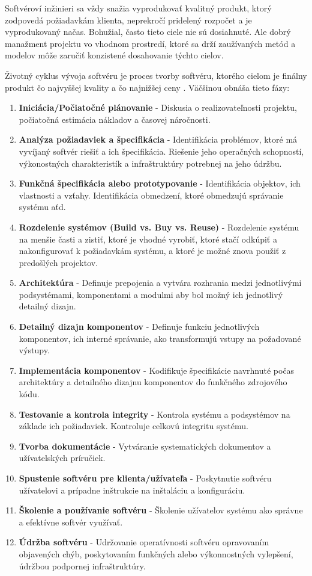 \documentclass[10pt,twoside,slovak,a4paper]{article}
\begin{document}
Softvéroví inžinieri sa vždy snažia vyprodukovať kvalitný produkt, ktorý zodpovedá požiadavkám klienta, neprekročí pridelený rozpočet a je vyprodukovaný načas. Bohužial, často tieto ciele nie sú dosiahnuté. Ale dobrý manažment projektu vo vhodnom prostredí, ktoré sa drží zaužívaných metód a modelov môže zaručiť konzistené dosahovanie týchto cielov. \cite{Methodologies}

Životný cyklus vývoja softvéru je proces tvorby softvéru, ktorého cielom je finálny produkt čo najvyššej kvality a čo najnižšej ceny \cite{SDLCdef}. Väčšinou obnáša tieto fázy:\cite{SDCLphases}
\begin{enumerate}
\item \textbf{Iniciácia/Počiatočné plánovanie} - Diskusia o realizovateľnosti projektu, počiatočná estimácia nákladov a časovej náročnosti.
\item \textbf{Analýza požiadaviek a špecifikácia} - Identifikácia problémov, ktoré má vyvíjaný softvér riešiť a ich špecifikácia. Riešenie jeho operačných schopností, výkonostných charakteristík a infraštruktúry potrebnej na jeho údržbu.
\item \textbf{Funkčná špecifikácia alebo prototypovanie} - Identifikácia objektov, ich vlastnosti a vzťahy. Identifikácia obmedzení, ktoré obmedzujú správanie systému aťd. 
\item \textbf{Rozdelenie systémov (Build vs. Buy vs. Reuse)} - Rozdelenie systému na menšie časti a zistiť, ktoré je vhodné vyrobiť, ktoré stačí odkúpiť a nakonfigurovať k požiadavkám systému, a ktoré je možné znova použiť z predošlých projektov.
\item \textbf{Architektúra} - Definuje prepojenia a vytvára rozhrania medzi jednotlivými podsystémami, komponentami a modulmi aby bol možný ich jednotlivý detailný dizajn.
\item \textbf{Detailný dizajn komponentov} - Definuje funkciu jednotlivých komponentov, ich interné správanie, ako transformujú vstupy na požadované výstupy.
\item \textbf{Implementácia komponentov} - Kodifikuje špecifikácie navrhnuté počas architektúry a detailného dizajnu komponentov do funkčného zdrojového kódu.
\item \textbf{Testovanie a kontrola integrity} - Kontrola systému a podsystémov na základe ich požiadaviek. Kontroluje celkovú integritu systému.
\item \textbf{Tvorba dokumentácie} - Vytváranie systematických dokumentov a užívatelských príručiek.
\item \textbf{Spustenie softvéru pre klienta/užívateľa} - Poskytnutie softvéru užívatelovi a prípadne inštrukcie na inštaláciu a konfiguráciu.
\item \textbf{Školenie a používanie softvéru} - Školenie užívatelov systému ako správne a efektívne softvér využívať.
\item \textbf{Údržba softvéru} - Udržovanie operatívnosti softvéru opravovaním objavených chýb, poskytovaním funkčných alebo výkonnostných vylepšení, údržbou podpornej infraštruktúry.
\end{enumerate}
\end{document}
